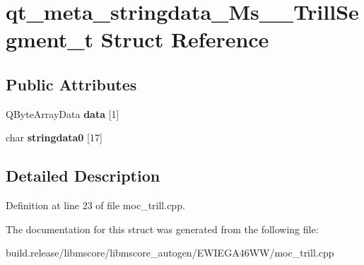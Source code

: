 \hypertarget{structqt__meta__stringdata___ms_____trill_segment__t}{}\section{qt\+\_\+meta\+\_\+stringdata\+\_\+\+Ms\+\_\+\+\_\+\+Trill\+Segment\+\_\+t Struct Reference}
\label{structqt__meta__stringdata___ms_____trill_segment__t}
\subsection*{Public Attributes}
\begin{DoxyCompactItemize}
\item 
\mbox{\label{structqt__meta__stringdata___ms_____trill_segment__t_ad0742fb4af315a39b7a23a39b153c11b}} 
Q\+Byte\+Array\+Data {\bfseries data} \mbox{[}1\mbox{]}
\item 
\mbox{\label{structqt__meta__stringdata___ms_____trill_segment__t_aaf6d1ac1b36f3d3440c39d1a7deef086}} 
char {\bfseries stringdata0} \mbox{[}17\mbox{]}
\end{DoxyCompactItemize}


\subsection{Detailed Description}


Definition at line 23 of file moc\+\_\+trill.\+cpp.



The documentation for this struct was generated from the following file\+:\begin{DoxyCompactItemize}
\item 
build.\+release/libmscore/libmscore\+\_\+autogen/\+E\+W\+I\+E\+G\+A46\+W\+W/moc\+\_\+trill.\+cpp\end{DoxyCompactItemize}

